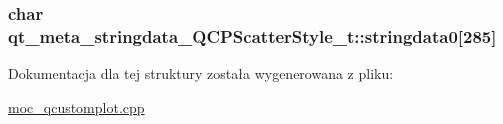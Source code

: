 \subsubsection[{\texorpdfstring{stringdata0}{stringdata0}}]{\setlength{\rightskip}{0pt plus 5cm}char qt\+\_\+meta\+\_\+stringdata\+\_\+\+Q\+C\+P\+Scatter\+Style\+\_\+t\+::stringdata0\mbox{[}285\mbox{]}}\hypertarget{structqt__meta__stringdata___q_c_p_scatter_style__t_a6689ed585bd8409634a978fad9b94c3a}{}\label{structqt__meta__stringdata___q_c_p_scatter_style__t_a6689ed585bd8409634a978fad9b94c3a}


Dokumentacja dla tej struktury została wygenerowana z pliku\+:\begin{DoxyCompactItemize}
\item 
\hyperlink{moc__qcustomplot_8cpp}{moc\+\_\+qcustomplot.\+cpp}\end{DoxyCompactItemize}
